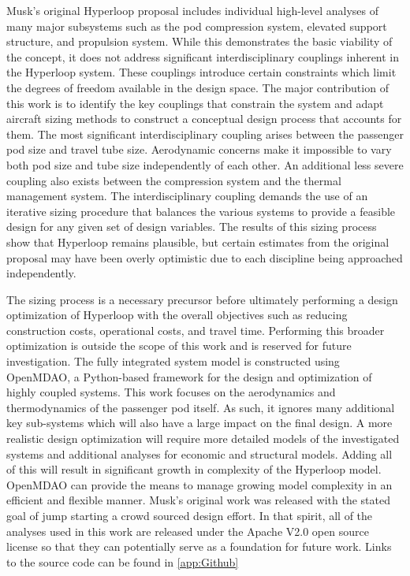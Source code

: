 \documentclass[heading.tex]{subfiles}
\begin{document}
Musk's original Hyperloop proposal includes individual high-level analyses of many major subsystems such as the pod compression system,
elevated support structure, and propulsion system. While this demonstrates the basic viability of the concept, it does not address
significant interdisciplinary couplings inherent in the Hyperloop system. These couplings introduce certain constraints which limit the 
degrees of freedom available in the design space. The major contribution of this work is to identify the key couplings that constrain the system
and adapt aircraft sizing methods to construct a conceptual design process that accounts for them. The most significant 
interdisciplinary coupling arises between the passenger pod size and travel tube size. Aerodynamic concerns make it impossible to vary 
both pod size and tube size independently of each other. An additional less severe coupling also exists between the compression system and 
the thermal management system. The interdisciplinary coupling demands the use of an iterative sizing procedure that balances 
the various systems to provide a feasible design for any given set of design variables. The results of this sizing process show that
Hyperloop remains plausible, but certain estimates from the original proposal may have been overly optimistic due to each discipline being approached independently. 

The sizing process is a necessary precursor before ultimately performing a design optimization of 
Hyperloop with the overall objectives such as reducing construction costs, operational costs, and travel time.
Performing this broader optimization 
is outside the scope of this work and is reserved for future investigation. 
The fully integrated system model is constructed using OpenMDAO, a Python-based framework for 
the design and optimization of highly coupled systems\cite{GrayBenchmarking2013}. 
This work focuses on the aerodynamics and thermodynamics of the passenger pod itself.
As such, it ignores many additional key sub-systems which will also have a large impact on the final design.
A more realistic design optimization will require more detailed models of the investigated systems and additional analyses for economic and 
structural models. Adding all of this will result in significant growth in complexity of the Hyperloop model. 
OpenMDAO can provide the means to manage growing model complexity 
in an efficient and flexible manner. Musk's original work was released with the stated goal of jump starting
a crowd sourced design effort. In that spirit, all of the analyses used in this work are released under
the Apache V2.0 open source license so that they can potentially serve as a foundation for future work. 
Links to the source code can be found in \cref{app:Github}
\end{document}
